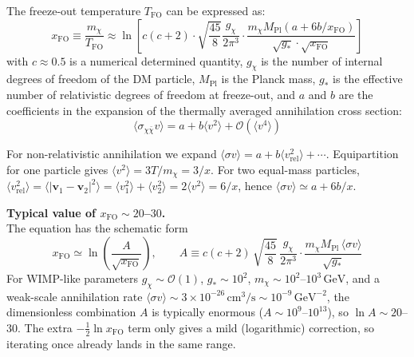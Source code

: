 \bigskip \noindent
\begin{theory}
    The freeze-out temperature $T_{\mathrm{FO}}$ can be expressed as:
    \[
        x_{\mathrm{FO}} \equiv \frac{m_\chi}{T_{\mathrm{FO}}} \approx \ln \left[ c(c+2) \cdot \sqrt{\frac{45}{8}} \frac{g_\chi}{2 \pi^3} \cdot \frac{m_\chi M_{\text{Pl}} \left( a + 6b / x_{\mathrm{FO}}  \right)}{\sqrt{g_*} \cdot \sqrt{x_{\mathrm{FO}}}} \right]
    \]
    with $c \approx 0.5$ is a numerical determined quantity, $g_\chi$ is the number of internal degrees of freedom of the DM particle, $M_{\text{Pl}}$ is the Planck mass, $g_*$ is the effective number of relativistic degrees of freedom at freeze-out, and $a$ and $b$ are the coefficients in the expansion of the thermally averaged annihilation cross section:
    \[
        \langle \sigma_{\chi \bar{\chi}} v \rangle = a + b \langle v^2 \rangle + \mathcal{O}(\langle v^4 \rangle)
    \]
\end{theory}

\bigskip \noindent
\begin{remark}
    For non-relativistic annihilation we expand
    \(\langle\sigma v\rangle=a+b\langle v_{\mathrm{rel}}^2\rangle+\cdots\).
    Equipartition for one particle gives $\langle v^2\rangle=3T/m_\chi=3/x$. For two equal-mass particles,
    $\langle v_{\mathrm{rel}}^2\rangle=\langle|\mathbf v_1-\mathbf v_2|^2\rangle=\langle v_1^2\rangle+\langle v_2^2\rangle=2\langle v^2\rangle=6/x$,
    hence $\langle\sigma v\rangle\simeq a+6b/x$.
\end{remark}


\bigskip \noindent
\begin{remark}
    \textbf{Typical value of $x_{\mathrm{FO}}\sim 20$--$30$.}\\
    The equation has the schematic form
    \[
        x_{\mathrm{FO}}\simeq \ln\!\left(\frac{A}{\sqrt{x_{\mathrm{FO}}}}\right),
        \qquad
        A\equiv c(c+2)\,\sqrt{\frac{45}{8}}\,\frac{g_\chi}{2\pi^3}\cdot \frac{m_\chi M_{\text{Pl}}\,\langle\sigma v\rangle}{\sqrt{g_*}}
    \]
    For WIMP-like parameters $g_\chi\sim\mathcal{O}(1)$, $g_*\sim 10^2$, $m_\chi\sim 10^2$--$10^3\,\mathrm{GeV}$, and a weak-scale annihilation rate
    $\langle\sigma v\rangle\sim 3\times 10^{-26}\,\mathrm{cm}^3/\mathrm{s}\sim 10^{-9}\,\mathrm{GeV}^{-2}$,
    the dimensionless combination $A$ is typically enormous ($A\sim 10^9$--$10^{13}$), so $\ln A\sim 20$--$30$.
    The extra $-\tfrac{1}{2}\ln x_{\mathrm{FO}}$ term only gives a mild (logarithmic) correction, so iterating once already lands in the same range.
\end{remark}



